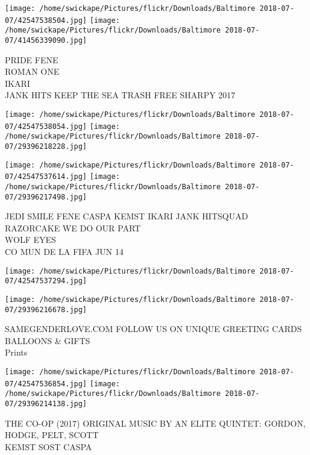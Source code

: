 \documentclass[10pt,letterpaper]{article}
\begin{document}
\texttt{[image: /home/swickape/Pictures/flickr/Downloads/Baltimore 2018-07-07/42547538504.jpg]}
\texttt{[image: /home/swickape/Pictures/flickr/Downloads/Baltimore 2018-07-07/41456339090.jpg]}

PRIDE FENE\\
ROMAN ONE\\
IKARI\\
JANK HITS KEEP THE SEA TRASH FREE SHARPY 2017\\
\pagebreak

\texttt{[image: /home/swickape/Pictures/flickr/Downloads/Baltimore 2018-07-07/42547538054.jpg]}
\texttt{[image: /home/swickape/Pictures/flickr/Downloads/Baltimore 2018-07-07/29396218228.jpg]}

\texttt{[image: /home/swickape/Pictures/flickr/Downloads/Baltimore 2018-07-07/42547537614.jpg]}
\texttt{[image: /home/swickape/Pictures/flickr/Downloads/Baltimore 2018-07-07/29396217498.jpg]}

JEDI SMILE FENE CASPA KEMST IKARI JANK HITSQUAD\\
RAZORCAKE WE DO OUR PART\\
WOLF EYES\\
CO MUN DE LA FIFA JUN 14\\
\pagebreak

\texttt{[image: /home/swickape/Pictures/flickr/Downloads/Baltimore 2018-07-07/42547537294.jpg]}

\vspace{0.25in}
\texttt{[image: /home/swickape/Pictures/flickr/Downloads/Baltimore 2018-07-07/29396216678.jpg]}

SAMEGENDERLOVE.COM FOLLOW US ON UNIQUE GREETING CARDS BALLOONS \& GIFTS\\
Prints\\
\pagebreak

\texttt{[image: /home/swickape/Pictures/flickr/Downloads/Baltimore 2018-07-07/42547536854.jpg]}
\texttt{[image: /home/swickape/Pictures/flickr/Downloads/Baltimore 2018-07-07/29396214138.jpg]}

THE CO{-}OP (2017) ORIGINAL MUSIC BY AN ELITE QUINTET: GORDON, HODGE, PELT, SCOTT\\
KEMST SOST CASPA\\
\pagebreak
\end{document}
